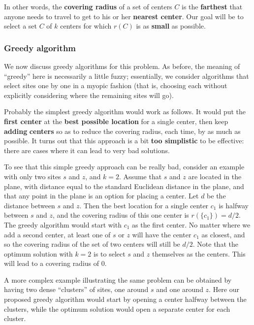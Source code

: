 In other words, the \textbf{covering radius} of a set of centers $C$ is the \textbf{farthest} that anyone needs to travel to get to his or her \textbf{nearest center}. Our goal will be to select a set $C$ of $k$ centers for which $r(C)$ is as \textbf{small} as possible.

\subsubsection{Greedy algorithm}
We now discuss greedy algorithms for this problem. As before, the meaning of “greedy” here is necessarily a little fuzzy; essentially, we consider algorithms that select sites one by one in a myopic fashion (that is, choosing each without explicitly considering where the remaining sites will go). 

Probably the simplest greedy algorithm would work as follows. It would put the \textbf{first center} at the \textbf{best possible location} for a single center, then keep \textbf{adding} \textbf{centers} so as to reduce the covering radius, each time, by as much as possible. It turns out that this approach is a bit \textbf{too simplistic} to be effective: there are cases where it can lead to very bad solutions. 

To see that this simple greedy approach can be really bad, consider an example with only two sites $s$ and $z$, and $k = 2$. Assume that $s$ and $z$ are located in the plane, with distance equal to the standard Euclidean distance in the plane, and that any point in the plane is an option for placing a center. Let $d$ be the distance between $s$ and $z$. Then the best location for a single center $c_1$ is halfway between $s$ and $z$, and the covering radius of this one center is $r(\{c_1\}) = d/2$. The greedy algorithm would start with $c_1$ as the first center. No matter where we add a second center, at least one of $s$ or $z$ will have the center $c_1$ as closest, and so the covering radius of the set of two centers will still be $d/2$. Note that the optimum solution with $k = 2$ is to select $s$ and $z$ themselves as the centers. This will lead to a covering radius of 0. 

A more complex example illustrating the same problem can be obtained by having two dense “clusters” of sites, one around $s$ and one around $z$. Here our proposed greedy algorithm would start by opening a center halfway between the clusters, while the optimum solution would open a separate center for each cluster.


